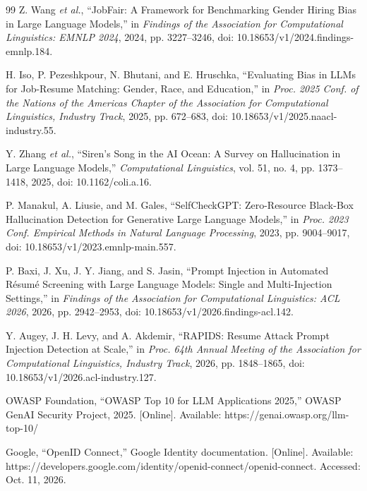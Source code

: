 \documentclass[conference]{IEEEtran}
\begin{document}
\begin{thebibliography}{99}
Z. Wang \emph{et al.},
``JobFair: A Framework for Benchmarking Gender Hiring Bias in Large Language Models,''
in \emph{Findings of the Association for Computational Linguistics: EMNLP 2024}, 2024, pp. 3227--3246, doi: 10.18653/v1/2024.findings-emnlp.184.

H. Iso, P. Pezeshkpour, N. Bhutani, and E. Hruschka,
``Evaluating Bias in LLMs for Job-Resume Matching: Gender, Race, and Education,''
in \emph{Proc. 2025 Conf. of the Nations of the Americas Chapter of the Association for Computational Linguistics, Industry Track}, 2025, pp. 672--683, doi: 10.18653/v1/2025.naacl-industry.55.

Y. Zhang \emph{et al.},
``Siren's Song in the AI Ocean: A Survey on Hallucination in Large Language Models,''
\emph{Computational Linguistics}, vol. 51, no. 4, pp. 1373--1418, 2025, doi: 10.1162/coli.a.16.

P. Manakul, A. Liusie, and M. Gales,
``SelfCheckGPT: Zero-Resource Black-Box Hallucination Detection for Generative Large Language Models,''
in \emph{Proc. 2023 Conf. Empirical Methods in Natural Language Processing}, 2023, pp. 9004--9017, doi: 10.18653/v1/2023.emnlp-main.557.

P. Baxi, J. Xu, J. Y. Jiang, and S. Jasin,
``Prompt Injection in Automated R\'{e}sum\'{e} Screening with Large Language Models: Single and Multi-Injection Settings,''
in \emph{Findings of the Association for Computational Linguistics: ACL 2026}, 2026, pp. 2942--2953, doi: 10.18653/v1/2026.findings-acl.142.

Y. Augey, J. H. Levy, and A. Akdemir,
``RAPIDS: Resume Attack Prompt Injection Detection at Scale,''
in \emph{Proc. 64th Annual Meeting of the Association for Computational Linguistics, Industry Track}, 2026, pp. 1848--1865, doi: 10.18653/v1/2026.acl-industry.127.

OWASP Foundation,
``OWASP Top 10 for LLM Applications 2025,''
OWASP GenAI Security Project, 2025. [Online]. Available: https://genai.owasp.org/llm-top-10/


Google,
``OpenID Connect,''
Google Identity documentation. [Online]. Available: https://developers.google.com/identity/openid-connect/openid-connect. Accessed: Oct. 11, 2026.

\end{thebibliography}
\end{document}
